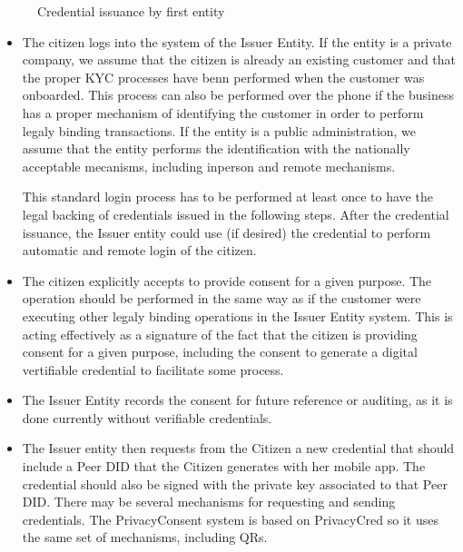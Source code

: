 \documentclass[a4paper,12pt,english,openany]{sphinxmanual}
\begin{document}
\begin{figure}[htbp]
\centering
\capstart

\noindent{}
\caption{Credential issuance by first entity}\label{\detokenize{privacyconsent:id1}}\end{figure}
\begin{itemize}
\item {} 
\sphinxAtStartPar
The citizen logs into the system of the Issuer Entity. If the entity is a private company, we assume that the citizen is already an existing customer and that the proper KYC processes have benn performed when the customer was onboarded. This process can also be performed over the phone if the business has a proper mechanism of identifying the customer in order to perform legaly binding transactions. If the entity is a public administration, we assume that the entity performs the identification with the nationally acceptable mecanisms, including in\sphinxhyphen{}person and remote mechanisms.

\sphinxAtStartPar
This standard login process has to be performed at least once to have the legal backing of credentials issued in the following steps. After the credential issuance, the Issuer entity could use (if desired) the credential to perform automatic and remote login of the citizen.

\item {} 
\sphinxAtStartPar
The citizen explicitly accepts to provide consent for a given purpose. The operation should be performed in the same way as if the customer were executing other legaly binding operations in the Issuer Entity system. This is acting effectively as a signature of the fact that the citizen is providing consent for a given purpose, including the consent to generate a digital vertifiable credential to facilitate some process.

\item {} 
\sphinxAtStartPar
The Issuer Entity records the consent for future reference or auditing, as it is done currently without verifiable credentials.

\item {} 
\sphinxAtStartPar
The Issuer entity then requests from the Citizen a new credential that should include a Peer DID that the Citizen generates with her mobile app. The credential should also be signed with the private key associated to that Peer DID. There may be several mechanisms for requesting and sending credentials. The PrivacyConsent system is based on PrivacyCred so it uses the same set of mechanisms, including QRs.


\end{itemize}
\end{document}
